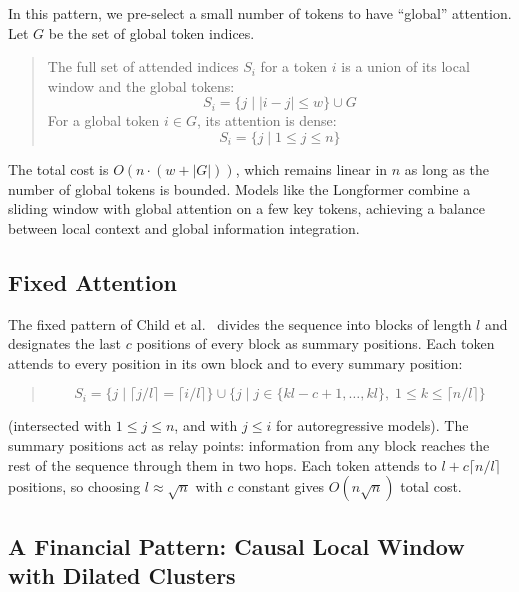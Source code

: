 \documentclass{article}
\begin{document}
In this pattern, we pre-select a small number of tokens to have ``global'' attention. Let \(G\) be the set of global token indices.
\begin{quote}
The full set of attended indices \(S_i\) for a token \(i\) is a union of its local window and the global tokens:
\[
S_i = \{j \mid |i - j| \le w \} \cup G
\]
For a global token \(i \in G\), its attention is dense:
\[
S_i = \{j \mid 1 \le j \le n\}
\]
\end{quote}
The total cost is \(O(n \cdot (w + |G|))\), which remains linear in \(n\) as long as the number of global tokens is bounded. Models like the Longformer combine a sliding window with global attention on a few key tokens, achieving a balance between local context and global information integration.

\subsection{Fixed Attention}

The fixed pattern of Child et al.~\cite{child2019generating} divides the sequence into blocks of length \(l\) and designates the last \(c\) positions of every block as summary positions. Each token attends to every position in its own block and to every summary position:
\begin{quote}
\[
S_i = \{j \mid \lceil j / l \rceil = \lceil i / l \rceil \} \cup \{j \mid j \in \{kl - c + 1, \ldots, kl\}, \; 1 \le k \le \lceil n / l \rceil \}
\]
\end{quote}
(intersected with \(1 \le j \le n\), and with \(j \le i\) for autoregressive models). The summary positions act as relay points: information from any block reaches the rest of the sequence through them in two hops. Each token attends to \(l + c \lceil n/l \rceil\) positions, so choosing \(l \approx \sqrt{n}\) with \(c\) constant gives \(O(n \sqrt{n})\) total cost.

\subsection{A Financial Pattern: Causal Local Window with Dilated Clusters}
\end{document}
